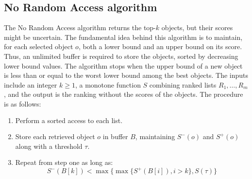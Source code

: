 \subsection{No Random Access algorithm}
The No Random Access algorithm returns the top-$k$ objects, but their scores might be uncertain. 
The fundamental idea behind this algorithm is to maintain, for each selected object $o$, both a lower bound and an upper bound on its score.
Thus, an unlimited buffer is required to store the objects, sorted by decreasing lower bound values.
The algorithm stops when the upper bound of a new object is less than or equal to the worst lower bound among the best objects.
The inputs include an integer $k \geq 1$, a monotone function $S$ combining ranked lists $R_1, \dots, R_m$, and the output is the ranking without the scores of the objects. 
The procedure is as follows:
\begin{enumerate}
    \item Perform a sorted access to each list.
    \item Store each retrieved object $o$ in buffer $B$, maintaining $S^{-}(o)$ and $S^{+}(o)$ along with a threshold $\tau$.
    \item Repeat from step one as long as:
        \[S^{-}(B[k])<\max\{\max\{S^{+}(B[i]),i>k\},S(\tau)\}\]
\end{enumerate}
